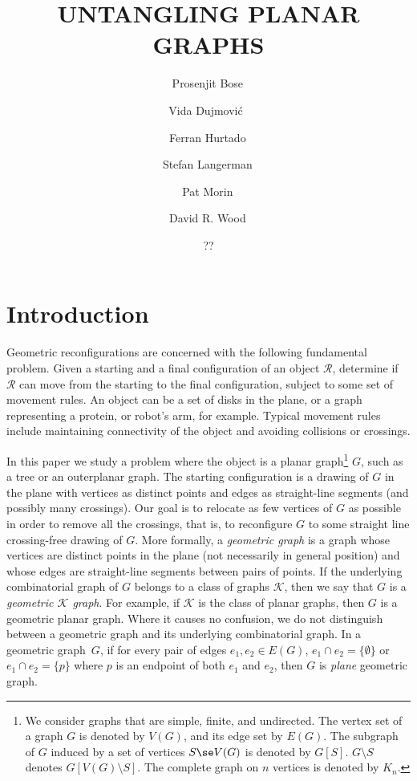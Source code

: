 \documentclass[lotsofwhite,charterfonts, letter]{patmorin}
\title{\MakeUppercase{Untangling Planar Graphs}}
\author{
	Prosenjit Bose\,\footnotemark[1] \and
	Vida Dujmovi\'c \,\footnotemark[2] \and
	Ferran Hurtado\,\footnotemark[3] \and
    Stefan Langerman\,\footnotemark[4]  \and
	Pat Morin\,\footnotemark[1] \and
	David R. Wood\,\footnotemark[5] \and ??\and
}
\date{}
\renewcommand{\gg}{geometric graph}
\newcommand{\gp}{geometric planar graph}
\renewcommand{\thefootnote}{\fnsymbol{footnote}}
\begin{document}
\maketitle

\renewcommand{\thefootnote}{\arabic{footnote}}

\begin{abstract}

\end{abstract}
\newpage
\section{Introduction}



Geometric reconfigurations are concerned with the following fundamental problem. Given a starting and a final configuration of an object $\mathcal R$, determine if $\mathcal R$ can move from the starting to the final configuration, subject to some set of movement rules. An object can be a set of disks in the plane, or a graph representing a protein, or robot's arm, for example. Typical movement rules include maintaining connectivity of the object and avoiding collisions or crossings.


In this paper we study a problem where the object is a planar graph\footnote{We consider graphs that are simple, finite, and undirected.  The vertex set of a graph $G$ is denoted by $V(G)$, and its edge set by $E(G)$. The subgraph of $G$ induced by a set of vertices $S\se V(G)$ is denoted by $G[S]$. $G\setminus S$ denotes $G[V(G)\setminus S]$. The complete graph on $n$ vertices is denoted by $K_n$. %
} $G$, such as a tree or an outerplanar graph. The starting configuration is a drawing of $G$ in the plane with vertices as distinct points and edges as straight-line segments (and possibly many crossings). 
Our goal is to relocate as few vertices of $G$ as possible in order to remove all the crossings, that is, to reconfigure $G$ to some straight line crossing-free drawing of $G$. More formally, a \emph{geometric graph} is a graph whose vertices are distinct points in the plane (not necessarily in general position) and whose edges are straight-line segments between pairs of points. If the underlying combinatorial graph of $G$ belongs to a class of graphs $\mathcal K$, then we say that $G$ is a \emph{geometric $\mathcal K$ graph}. For example, if $\mathcal K$ is the class of planar graphs, then $G$ is a \gp. Where it causes no confusion, we do not distinguish between a geometric graph and its underlying combinatorial graph. In a \gg\ $G$, if for every pair of edges $e_1,e_2\in E(G)$, $e_1\cap e_2=\{\emptyset\}$ or $e_1\cap e_2=\{p\}$ where $p$ is an endpoint of both $e_1$ and $e_2$, then $G$ is \emph{plane} \gg. 
 
\end{document}
